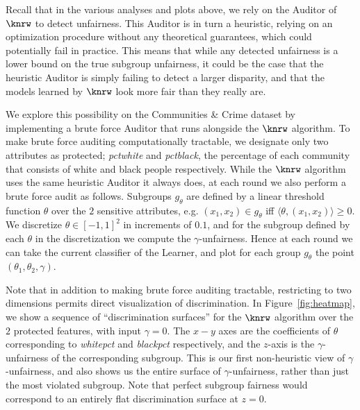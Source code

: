 Recall that in the various analyses and plots above, we rely on the
Auditor of $\knrw$ to detect unfairness. This Auditor is in turn a heuristic,
relying on an optimization procedure without any theoretical guarantees, which could potentially fail in practice.
This means that while any detected unfairness is a lower bound on the true subgroup unfairness,
it could be the case that the heuristic Auditor is simply failing to detect a larger disparity,
and that the models learned by $\knrw$ look more fair than they really are.

We explore this possibility on the Communities \& Crime dataset by implementing a brute force
Auditor that runs alongside the $\knrw$ algorithm. To make brute force auditing computationally tractable,
we designate only two attributes as protected; \textit{pctwhite} and \textit{pctblack},
the percentage of each community that consists of white and black people respectively.
While the $\knrw$ algorithm uses the same heuristic Auditor it always does,
at each round we also perform a brute force audit as follows.
Subgroups $g_\theta$ are defined by a linear threshold function $\theta$ over the $2$ sensitive attributes, e.g. $(x_1, x_2) \in g_\theta$ iff
$\langle \theta, (x_1, x_2) \rangle \geq 0$. We discretize $\theta \in [-1,1]^2$ in increments of $0.1$, and for the subgroup defined by each $\theta$ in the discretization we compute the $\gamma$-unfairness. Hence at each round we can take the current classifier of the Learner, and plot for each group $g_\theta$ the point $(\theta_1, \theta_2, \gamma)$.

Note that in addition to making brute force auditing tractable, restricting to two dimensions permits direct visualization of discrimination.
In Figure~\ref{fig:heatmap}, we show a sequence of ``discrimination surfaces'' for the $\knrw$ algorithm over the $2$ protected features,
with input $\gamma = 0$. The $x-y$ axes are the coefficients of $\theta$
corresponding to \textit{whitepct} and \textit{blackpct} respectively, and the $z$-axis is the $\gamma$-unfairness of
the corresponding subgroup. This is our first non-heuristic view of $\gamma$-unfairness, and
also shows us the entire surface of $\gamma$-unfairness, rather than just the most violated subgroup.
Note that perfect subgroup fairness would correspond to an entirely flat discrimination surface at $z = 0$.

